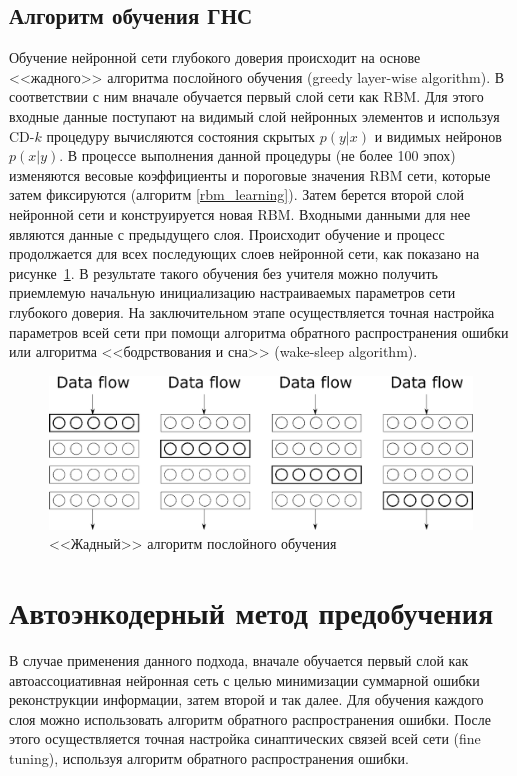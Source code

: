 \subsection{Алгоритм обучения ГНС} \label{subsect1_3_2}

Обучение нейронной сети глубокого доверия происходит на основе <<жадного>> алгоритма послойного обучения (greedy layer-wise algorithm). В соответствии с ним вначале обучается первый слой сети как RBM. Для этого входные данные поступают на видимый слой нейронных элементов и используя CD-$k$ процедуру вычисляются состояния скрытых $p(y \lvert x)$ и видимых нейронов $p(x \lvert y)$. В процессе выполнения данной процедуры (не более 100 эпох) изменяются весовые коэффициенты и пороговые значения RBM сети, которые затем фиксируются (алгоритм \ref{rbm_learning}). Затем берется второй слой нейронной сети и конструируется новая RBM. Входными данными для нее являются данные с предыдущего слоя. Происходит обучение и процесс продолжается для всех последующих слоев нейронной сети, как показано на рисунке~\ref{fig:pic1_4}. В результате такого обучения без учителя можно получить приемлемую начальную инициализацию настраиваемых параметров сети глубокого доверия. На заключительном этапе осуществляется точная настройка параметров всей сети при помощи алгоритма обратного распространения ошибки или алгоритма <<бодрствования и сна>> (wake-sleep algorithm). 

\begin{figure}[H]
	\centering
	\includegraphics[width=\textwidth]{author/part3/figures/pic1-4.png}
	\caption{<<Жадный>> алгоритм послойного обучения}
	\label{fig:pic1_4}
\end{figure}

\newpage
\section{Автоэнкодерный метод предобучения} \label{subsect1_3_3}

В случае применения данного подхода, вначале обучается первый слой как автоассоциативная нейронная сеть с целью минимизации суммарной ошибки реконструкции информации, затем второй и так далее. Для обучения каждого слоя можно использовать алгоритм обратного распространения ошибки. После этого осуществляется точная настройка синаптических связей всей сети (fine tuning), используя алгоритм обратного распространения ошибки. 


